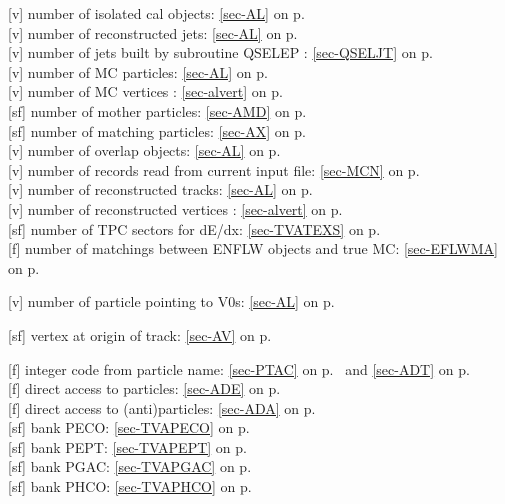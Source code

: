  [v] number of isolated cal objects: \ref{sec-AL} on p.~\pageref{sec-AL}\\
 [v] number of reconstructed jets: \ref{sec-AL} on p.~\pageref{sec-AL}\\
 [v] number of jets built by subroutine QSELEP : \ref{sec-QSELJT} on p.~\pageref{sec-QSELJT}\\
 [v] number of MC particles: \ref{sec-AL} on p.~\pageref{sec-AL}\\
 [v] number of MC vertices : \ref{sec-alvert} on p.~\pageref{sec-alvert}\\
 [sf] number of mother particles: \ref{sec-AMD} on p.~\pageref{sec-AMD}\\
 [sf] number of matching particles: \ref{sec-AX} on p.~\pageref{sec-AX}\\
 [v] number of overlap objects: \ref{sec-AL} on p.~\pageref{sec-AL}\\
 [v] number of records read from current input
 file:
 \ref{sec-MCN} on p.~\pageref{sec-MCN}\\
 [v] number of reconstructed tracks: \ref{sec-AL} on p.~\pageref{sec-AL}\\
 [v] number of reconstructed vertices  : \ref{sec-alvert} on p.~\pageref{sec-alvert}\\
 [sf] number of TPC sectors for dE/dx:
 \ref{sec-TVATEXS} on p.~\pageref{sec-TVATEXS}\\
 [f] number of matchings between ENFLW objects and true MC:
  \ref{sec-EFLWMA} on p.~\pageref{sec-EFLWMA}
 
 [v] number of particle pointing to V0s: \ref{sec-AL} on p.~\pageref{sec-AL}
 
 [sf] vertex at origin of track: \ref{sec-AV} on p.~\pageref{sec-AV}
 
 [f] integer code from particle name:
 \ref{sec-PTAC} on p.~\pageref{sec-PTAC} and \ref{sec-ADT} on p.~\pageref{sec-ADT}\\
 [f] direct access to particles: \ref{sec-ADE} on p.~\pageref{sec-ADE}\\
 [f] direct access to (anti)particles: \ref{sec-ADA} on p.~\pageref{sec-ADA}\\
 [sf] bank PECO: \ref{sec-TVAPECO} on p.~\pageref{sec-TVAPECO}\\
 [sf] bank PEPT: \ref{sec-TVAPEPT} on p.~\pageref{sec-TVAPEPT}\\
 [sf] bank PGAC: \ref{sec-TVAPGAC} on p.~\pageref{sec-TVAPGAC}\\
 [sf] bank PHCO: \ref{sec-TVAPHCO} on p.~\pageref{sec-TVAPHCO}
 
